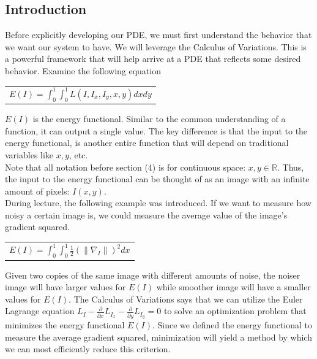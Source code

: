\documentclass{article}
\begin{document}
  \subsection{Introduction}
  Before explicitly developing our PDE, we must first understand the behavior that we want our system to have.
  We will leverage the Calculus of Variations. This is a powerful framework that will help arrive at a PDE
  that reflects some desired behavior. Examine the following equation
  \begin{center}
    \begin{tabular}{l}
      $E(I) = \int_{0}^{1} \int_{0}^{1} L(I, I_{x}, I_{y}, x, y) dx dy$
    \end{tabular}
  \end{center}

  \noindent
  $E(I)$ is the energy functional. Similar to the common understanding of a function, it can output
  a single value. The key difference is that the input to the energy functional, is another entire
  function that will depend on traditional variables like $x,y$, etc.\\

  \noindent
  Note that all notation before section (4) is for continuous space: $x,y \in \mathbb{R}$. Thus,
  the input to the energy functional can be thought of as an image with an infinite amount of pixels: $I(x,y)$.\\

  \noindent
  During lecture, the following example was introduced. If we want to measure how noisy a certain image is,
  we could measure the average value of the image's gradient squared.
  \begin{center}
    \begin{tabular}{l}
      $E(I) = \int_{0}^{1} \int_{0}^{1} \frac{1}{2} (\| \nabla_{I} \|)^{2} dx$
    \end{tabular}
  \end{center}

  \noindent
  Given two copies of the same image with different amounts of noise, the noiser image will have larger values
  for $E(I)$ while smoother image will have a smaller values for $E(I)$. The Calculus of Variations says
  that we can utilize the Euler Lagrange equation
  $L_{I} - \frac{\partial}{\partial x}L_{I_{x}} - \frac{\partial}{\partial y}L_{I_{y}} = 0$ to solve an
  optimization problem that minimizes the energy functional $E(I)$. Since we defined the
  energy functional to measure the average gradient squared, minimization will yield a method
  by which we can most efficiently reduce this criterion.\\
\end{document}
